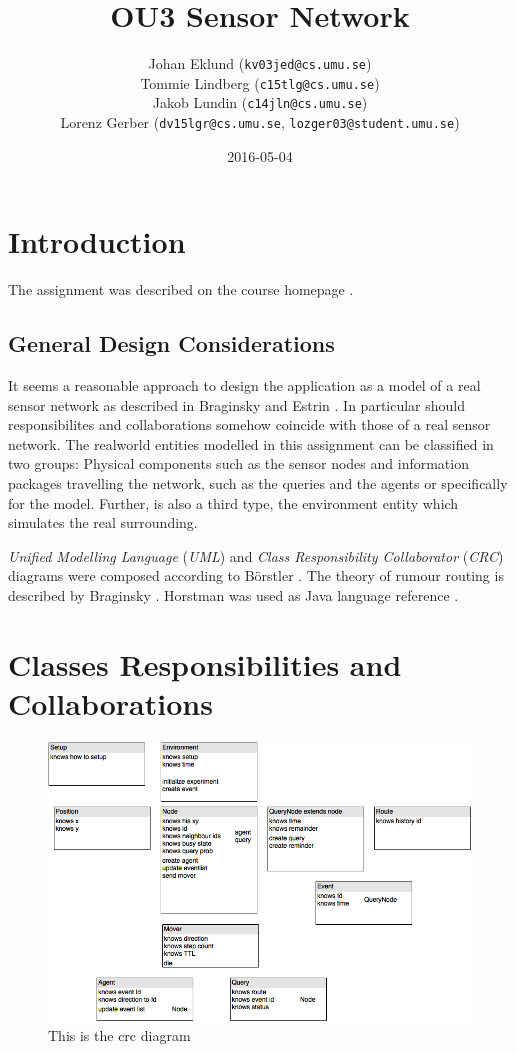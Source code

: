 \documentclass[a4paper,11pt,twoside]{article}
\title{OU3 Sensor Network}
\author{Johan Eklund ({\tt{kv03jed@cs.umu.se}}) \\ 
Tommie Lindberg ({\tt{c15tlg@cs.umu.se}}) \\
Jakob Lundin ({\tt{c14jln@cs.umu.se}}) \\
Lorenz Gerber ({\tt{dv15lgr@cs.umu.se}}, {\tt{lozger03@student.umu.se}})
}
\date{2016-05-04}
\begin{document}
\lstset{language=C}
\maketitle
\thispagestyle{empty}
\newpage
\tableofcontents
\thispagestyle{empty}
\newpage

\clearpage
{}

\section{Introduction} 
The assignment was described on the course homepage
\cite{sensornetwork}. 

\subsection{General Design Considerations}
It seems a reasonable approach to design the application as a model of a
real sensor network as described in Braginsky and Estrin
\cite{braginsky2002}. In particular should responsibilites
and collaborations somehow coincide with those of a real sensor
network. The realworld entities modelled in this assignment can be classified
in two groups: Physical components such as the sensor nodes and
information packages travelling the network, such as the queries and
the agents or specifically for the model. Further, is also a third
type, the environment entity which simulates the real surrounding.



\textit{Unified Modelling Language}
(\textit{UML}) and \textit{Class Responsibility Collaborator}
(\textit{CRC}) diagrams were composed according to Börstler
\cite{roleplay}. The theory of rumour routing is described by Braginsky
\cite{braginsky2002}. Horstman was used as Java language reference
\cite{horstman2014}.


\section{Classes Responsibilities and Collaborations}

\begin{figure}
\centering
\includegraphics[width=\textwidth]{crc.png}
\caption{This is the crc diagram}
\label{fig:crc}
\end{figure}
\end{document}
